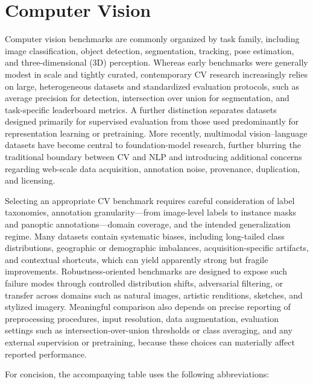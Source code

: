 \documentclass{article}
\begin{document}
\clearpage




\section{Computer Vision}

Computer vision benchmarks are commonly organized by task family, including image classification, object detection, segmentation, tracking, pose estimation, and three-dimensional (3D) perception. Whereas early benchmarks were generally modest in scale and tightly curated, contemporary CV research increasingly relies on large, heterogeneous datasets and standardized evaluation protocols, such as average precision for detection, intersection over union for segmentation, and task-specific leaderboard metrics. A further distinction separates datasets designed primarily for supervised evaluation from those used predominantly for representation learning or pretraining. More recently, multimodal vision--language datasets have become central to foundation-model research, further blurring the traditional boundary between CV and NLP and introducing additional concerns regarding web-scale data acquisition, annotation noise, provenance, duplication, and licensing.

Selecting an appropriate CV benchmark requires careful consideration of label taxonomies, annotation granularity---from image-level labels to instance masks and panoptic annotations---domain coverage, and the intended generalization regime. Many datasets contain systematic biases, including long-tailed class distributions, geographic or demographic imbalances, acquisition-specific artifacts, and contextual shortcuts, which can yield apparently strong but fragile improvements. Robustness-oriented benchmarks are designed to expose such failure modes through controlled distribution shifts, adversarial filtering, or transfer across domains such as natural images, artistic renditions, sketches, and stylized imagery. Meaningful comparison also depends on precise reporting of preprocessing procedures, input resolution, data augmentation, evaluation settings such as intersection-over-union thresholds or class averaging, and any external supervision or pretraining, because these choices can materially affect reported performance.

For concision, the accompanying table uses the following abbreviations:
\end{document}
